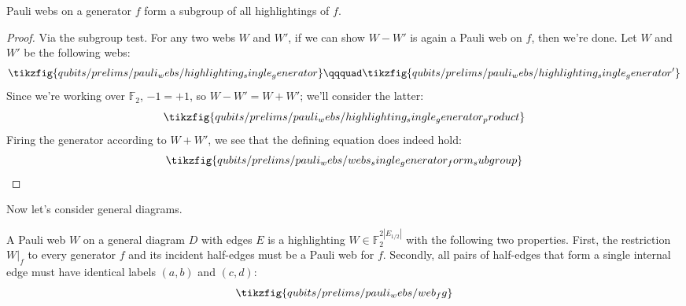 
\begin{proposition}\label{prop:pauli_webs_single_generator_form_subgroup}
    Pauli webs on a generator $f$ form a subgroup of all highlightings of $f$.
    \begin{proof}
        Via the subgroup test.
        For any two webs $W$ and $W'$, if we can show $W - W'$ is again a Pauli web on $f$, then we're done.
        Let $W$ and $W'$ be the following webs:
        \begin{equation}
            \tikzfig{qubits/prelims/pauli_webs/highlighting_single_generator}
            \qqquad
            \tikzfig{qubits/prelims/pauli_webs/highlighting_single_generator'}
        \end{equation}
        Since we're working over $\mathbb{F}_2$, $-1 = +1$, so $W - W' = W + W'$; we'll consider the latter:
        \begin{equation}
            \tikzfig{qubits/prelims/pauli_webs/highlighting_single_generator_product}
        \end{equation}
        Firing the generator according to $W + W'$, we see that the defining equation does indeed hold:
        \begin{equation}\label{eq:webs_single_generator_form_subgroup}
        \tikzfig{qubits/prelims/pauli_webs/webs_single_generator_form_subgroup}
        \end{equation}
    \end{proof}
\end{proposition}

Now let's consider general diagrams.

\begin{definition}\label{defn:pauli_web_general}
    A Pauli web $W$ on a general diagram $D$ with edges $E$ is a highlighting $W \in \mathbb{F}_2^{2|E_{1/2}|}$ with the following two properties.
    First, the restriction $W|_f$ to every generator $f$ and its incident half-edges must be a Pauli web for $f$.
    Secondly, all pairs of half-edges that form a single internal edge must have identical labels $(a, b)$ and $(c, d)$:
    \begin{equation}
        \tikzfig{qubits/prelims/pauli_webs/web_fg}
    \end{equation}
\end{definition}

